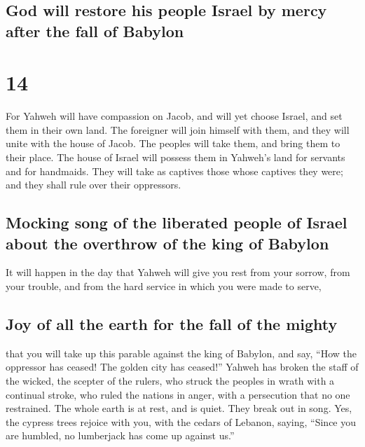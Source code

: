 \hypertarget{god-will-restore-his-people-israel-by-mercy-after-the-fall-of-babylon}{%
\subsection{God will restore his people Israel by mercy after the fall
of
Babylon}\label{god-will-restore-his-people-israel-by-mercy-after-the-fall-of-babylon}}

\hypertarget{section-13}{%
\section{14}\label{section-13}}

 For Yahweh will have compassion on Jacob, and will yet
choose Israel, and set them in their own land. The foreigner will join
himself with them, and they will unite with the house of Jacob.
 The peoples will take them, and bring them to their
place. The house of Israel will possess them in Yahweh's land for
servants and for handmaids. They will take as captives those whose
captives they were; and they shall rule over their oppressors.

\hypertarget{mocking-song-of-the-liberated-people-of-israel-about-the-overthrow-of-the-king-of-babylon}{%
\subsection{Mocking song of the liberated people of Israel about the
overthrow of the king of
Babylon}\label{mocking-song-of-the-liberated-people-of-israel-about-the-overthrow-of-the-king-of-babylon}}

 It will happen in the day that Yahweh will give you rest
from your sorrow, from your trouble, and from the hard service in which
you were made to serve,

\hypertarget{joy-of-all-the-earth-for-the-fall-of-the-mighty}{%
\subsection{Joy of all the earth for the fall of the
mighty}\label{joy-of-all-the-earth-for-the-fall-of-the-mighty}}

 that you will take up this parable against the king of
Babylon, and say, ``How the oppressor has ceased! The golden city has
ceased!''  Yahweh has broken the staff of the wicked, the
scepter of the rulers,  who struck the peoples in wrath
with a continual stroke, who ruled the nations in anger, with a
persecution that no one restrained.  The whole earth is at
rest, and is quiet. They break out in song.  Yes, the
cypress trees rejoice with you, with the cedars of Lebanon, saying,
``Since you are humbled, no lumberjack has come up against us.''


